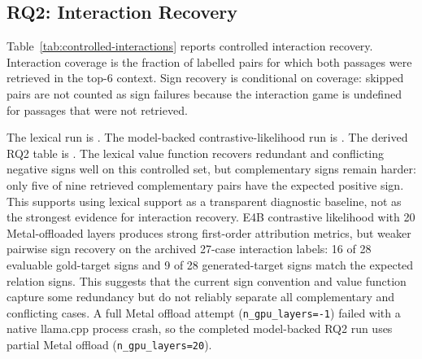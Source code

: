 \documentclass[10pt]{article}
\begin{document}
\subsection{RQ2: Interaction Recovery}
Table~\ref{tab:controlled-interactions} reports controlled interaction
recovery. Interaction coverage is the fraction of labelled pairs for which
both passages were retrieved in the top-6 context. Sign recovery is conditional
on coverage: skipped pairs are not counted as sign failures because the
interaction game is undefined for passages that were not retrieved.

\begin{table}[ht]
\centering
\small
\caption{Controlled interaction recovery. Sign recovery is conditional on both
passages being retrieved.}
\label{tab:controlled-interactions}
\end{table}

The lexical run is
. The
model-backed contrastive-likelihood run is
. The
derived RQ2 table is
. The
lexical value function recovers redundant and conflicting negative signs well
on this controlled set, but complementary signs remain harder: only five of
nine retrieved complementary pairs have the expected positive sign. This
supports using lexical support as a transparent diagnostic baseline, not as the
strongest evidence for interaction recovery. E4B contrastive likelihood with
20 Metal-offloaded layers produces strong first-order attribution metrics, but
weaker pairwise sign recovery on the archived 27-case interaction labels: 16 of 28
evaluable gold-target signs and 9 of 28 generated-target signs match the
expected relation signs. This suggests that the current sign convention and
value function capture some redundancy but do not reliably separate all
complementary and conflicting cases. A full Metal offload attempt
(\texttt{n\_gpu\_layers=-1}) failed with a native llama.cpp process crash, so
the completed model-backed RQ2 run uses partial Metal offload
(\texttt{n\_gpu\_layers=20}).
\end{document}
